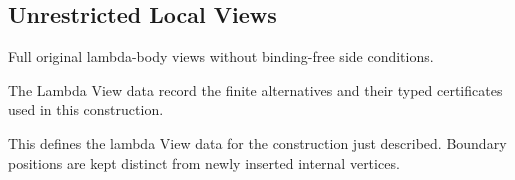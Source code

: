 \subsection{Unrestricted Local Views}
Full original lambda-body views without binding-free side conditions.

The Lambda View data record the finite alternatives and their typed certificates used in this construction.
\par{}

This defines the lambda View data for the construction just described. Boundary positions are kept distinct from newly inserted internal vertices.
\par{}

